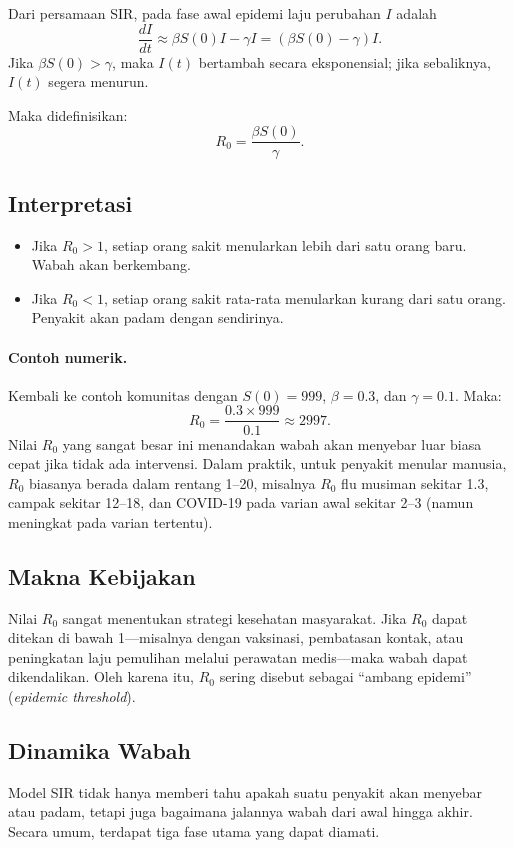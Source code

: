 \documentclass{bukumjh}
\begin{document}
Dari persamaan SIR, pada fase awal epidemi laju perubahan $I$ adalah
\[
\frac{dI}{dt} \approx \beta S(0) I - \gamma I = \left( \beta S(0) - \gamma \right) I.
\]
Jika $\beta S(0) > \gamma$, maka $I(t)$ bertambah secara eksponensial; jika sebaliknya, $I(t)$ segera menurun.

Maka didefinisikan:
\[
R_0 = \frac{\beta S(0)}{\gamma}.
\]

\subsection*{Interpretasi}
\begin{itemize}
    \item Jika $R_0 > 1$, setiap orang sakit menularkan lebih dari satu orang baru. Wabah akan berkembang.
    \item Jika $R_0 < 1$, setiap orang sakit rata-rata menularkan kurang dari satu orang. Penyakit akan padam dengan sendirinya.
\end{itemize}

\paragraph{Contoh numerik.}  
Kembali ke contoh komunitas dengan $S(0)=999$, $\beta=0.3$, dan $\gamma=0.1$. Maka:
\[
R_0 = \frac{0.3 \times 999}{0.1} \approx 2997.
\]
Nilai $R_0$ yang sangat besar ini menandakan wabah akan menyebar luar biasa cepat jika tidak ada intervensi. Dalam praktik, untuk penyakit menular manusia, $R_0$ biasanya berada dalam rentang 1–20, misalnya $R_0$ flu musiman sekitar 1.3, campak sekitar 12–18, dan COVID-19 pada varian awal sekitar 2–3 (namun meningkat pada varian tertentu).

\subsection*{Makna Kebijakan}
Nilai $R_0$ sangat menentukan strategi kesehatan masyarakat. Jika $R_0$ dapat ditekan di bawah 1—misalnya dengan vaksinasi, pembatasan kontak, atau peningkatan laju pemulihan melalui perawatan medis—maka wabah dapat dikendalikan. Oleh karena itu, $R_0$ sering disebut sebagai “ambang epidemi” (\textit{epidemic threshold}).

\subsection{Dinamika Wabah}

Model SIR tidak hanya memberi tahu apakah suatu penyakit akan menyebar atau padam, tetapi juga bagaimana {\jsg jalannya wabah} dari awal hingga akhir. Secara umum, terdapat tiga fase utama yang dapat diamati.
\end{document}
